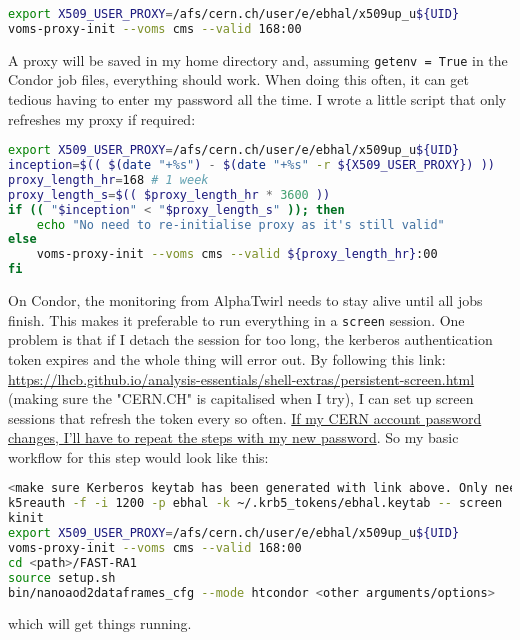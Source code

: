 \begin{lstlisting}[belowskip=-0.7cm, language=sh, numbers=none]
export X509_USER_PROXY=/afs/cern.ch/user/e/ebhal/x509up_u${UID}
voms-proxy-init --voms cms --valid 168:00
\end{lstlisting}

A proxy will be saved in my home directory and, assuming \texttt{getenv = True} in the Condor job files, everything should work. When doing this often, it can get tedious having to enter my password all the time. I wrote a little script that only refreshes my proxy if required:

\begin{lstlisting}[belowskip=-0.7cm, language=sh, numbers=none]
export X509_USER_PROXY=/afs/cern.ch/user/e/ebhal/x509up_u${UID}
inception=$(( $(date "+%s") - $(date "+%s" -r ${X509_USER_PROXY}) ))
proxy_length_hr=168 # 1 week                                                                               
proxy_length_s=$(( $proxy_length_hr * 3600 ))
if (( "$inception" < "$proxy_length_s" )); then
    echo "No need to re-initialise proxy as it's still valid"
else
    voms-proxy-init --voms cms --valid ${proxy_length_hr}:00
fi
\end{lstlisting}

On Condor, the monitoring from AlphaTwirl needs to stay alive until all jobs finish. This makes it preferable to run everything in a \texttt{screen} session. One problem is that if I detach the session for too long, the kerberos authentication token expires and the whole thing will error out. By following this link: \url{https://lhcb.github.io/analysis-essentials/shell-extras/persistent-screen.html} (making sure the "CERN.CH" is capitalised when I try), I can set up screen sessions that refresh the token every so often. \uline{If my CERN account password changes, I'll have to repeat the steps with my new password}. So my basic workflow for this step would look like this:

\begin{lstlisting}[belowskip=-0.7cm, language=sh, numbers=none]
<make sure Kerberos keytab has been generated with link above. Only needs to be done once>
k5reauth -f -i 1200 -p ebhal -k ~/.krb5_tokens/ebhal.keytab -- screen
kinit
export X509_USER_PROXY=/afs/cern.ch/user/e/ebhal/x509up_u${UID}
voms-proxy-init --voms cms --valid 168:00
cd <path>/FAST-RA1
source setup.sh
bin/nanoaod2dataframes_cfg --mode htcondor <other arguments/options>
\end{lstlisting}

which will get things running.

